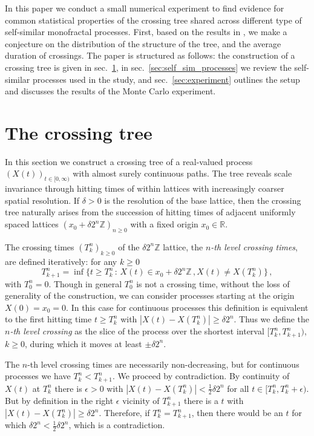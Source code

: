 \documentclass[a4paper]{article}
\newcommand{\Real}{\mathbb{R}}
\begin{document}
In this paper we conduct a small numerical experiment to find evidence for common
statistical properties of the crossing tree shared across different type of self-similar
monofractal processes. First, based on the results in \cite{ECP1673}, we make a
conjecture on the distribution of the structure of the tree, and the average duration
of crossings. The paper is structured as follows: the construction of a crossing tree
is given in sec.~\ref{sec:the_crossing_tree}, in sec.~\ref{sec:self_sim_processes}
we review the self-similar processes used in the study, and sec.~\ref{sec:experiment}
outlines the setup and discusses the results of the Monte Carlo experiment.


\section{The crossing tree} %
\label{sec:the_crossing_tree}

In this section we construct a crossing tree of a real-valued process $(X(t))_{t\in[0, \infty)}$
with almost surely continuous paths. The tree reveals scale invariance through hitting
times of within lattices with increasingly coarser spatial resolution. If $\delta>0$
is the resolution of the base lattice, then the crossing tree naturally arises from
the succession of hitting times of adjacent uniformly spaced lattices $(x_0 + \delta 2^n \mathbb{Z})_{n\geq 0}$
with a fixed origin $x_0\in \Real$.

The crossing times $(T_k^n)_{k\geq0}$ of the $\delta 2^n \mathbb{Z}$ lattice, the
\emph{$n$-th level crossing times}, are defined iteratively: for any $k\geq 0$
\begin{equation} \label{eq:xing_time}
  T_{k+1}^n = \inf\bigl\{t\geq T_k^n\,:\,
        X(t)\in x_0 + \delta 2^n \mathbb{Z}\,, X(t)\neq X(T^n_k)
    \bigr\} \,,
\end{equation}
with $T_0^n = 0$. Though in general $T_0^n$ is not a crossing time, without the
loss of generality of the construction, we can consider processes starting at the
origin $X(0)=x_0=0$. In this case for continuous processes this definition is equivalent
to the first hitting time $t\geq T_k^n$ with $|X(t) - X(T^n_k)| \geq \delta 2^n$.
Thus we define the \emph{$n$-th level crossing} as the slice of the process over
the shortest interval $[T_k^n, T_{k+1}^n)$, $k\geq 0$, during which it moves at
least $\pm \delta 2^n$.

The $n$-th level crossing times are necessarily non-decreasing, but for continuous
processes we have $T_k^n < T_{k+1}^n$. We proceed by contradiction. By continuity
of $X(t)$ at $T_k^n$ there is $\epsilon>0$ with $|X(t) - X(T_k^n)| < \frac{1}{2}\delta 2^n$
for all $t\in [T_k^n, T_k^n + \epsilon)$. But by definition in the right $\epsilon$
vicinity of $T_{k+1}^n$ there is a $t$ with $|X(t) - X(T_k^n)|\geq \delta 2^n$. Therefore,
if $T_k^n = T_{k+1}^n$, then there would be an $t$ for which $\delta 2^n < \frac{1}{2}\delta 2^n$,
which is a contradiction.
\end{document}

